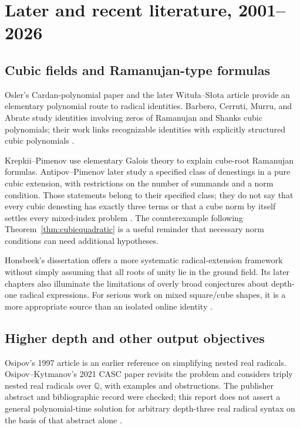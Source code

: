 \documentclass[11pt,oneside]{article}
\numberwithin{equation}{section}
\theoremstyle{definition}
\theoremstyle{remark}
\newcommand{\Q}{\mathbb{Q}}
\begin{document}
\section{Later and recent literature, 2001--2026}\label{sec:recent}

\subsection{Cubic fields and Ramanujan-type formulas}
Osler's Cardan-polynomial paper and the later Witu\l a--S\l ota article provide an elementary polynomial route to radical identities. Barbero, Cerruti, Murru, and Abrate study identities involving zeros of Ramanujan and Shanks cubic polynomials; their work links recognizable identities with explicitly structured cubic polynomials \cite{osler,witula,barbero}.

Krepkii--Pimenov use elementary Galois theory to explain cube-root Ramanujan formulas. Antipov--Pimenov later study a specified class of denestings in a pure cubic extension, with restrictions on the number of summands and a norm condition. Those statements belong to their specified class; they do not say that every cubic denesting has exactly three terms or that a cube norm by itself settles every mixed-index problem \cite{krepkii,antipov}. The counterexample following Theorem~\ref{thm:cubicquadratic} is a useful reminder that necessary norm conditions can need additional hypotheses.

Honsbeek's dissertation offers a more systematic radical-extension framework without simply assuming that all roots of unity lie in the ground field. Its later chapters also illuminate the limitations of overly broad conjectures about depth-one radical expressions. For serious work on mixed square/cube shapes, it is a more appropriate source than an isolated online identity \cite{honsbeek}.

\subsection{Higher depth and other output objectives}
Osipov's 1997 article is an earlier reference on simplifying nested real radicals. Osipov--Kytmanov's 2021 CASC paper revisits the problem and considers triply nested real radicals over $\Q$, with examples and obstructions. The publisher abstract and bibliographic record were checked; this report does not assert a general polynomial-time solution for arbitrary depth-three real radical syntax on the basis of that abstract alone \cite{osipov97,osipov21}.
\end{document}
